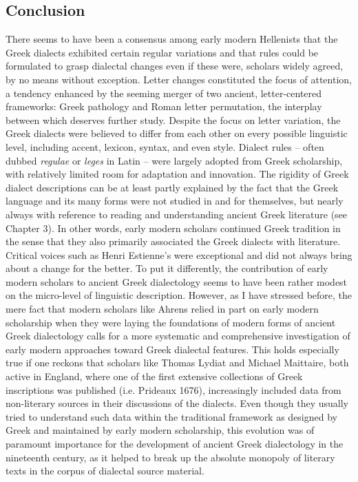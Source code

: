 \subsection{Conclusion}
\hypertarget{Toc19704848}{}\begin{styleStandard}
There seems to have been a consensus among early modern Hellenists that the Greek dialects exhibited certain regular variations and that rules could be formulated to grasp dialectal changes even if these were, scholars widely agreed, by no means without exception. Letter changes constituted the focus of attention, a tendency enhanced by the seeming merger of two ancient, letter-centered frameworks: Greek pathology and Roman letter permutation, the interplay between which deserves further study. Despite the focus on letter variation, the Greek dialects were believed to differ from each other on every possible linguistic level, including accent, lexicon, syntax, and even style. Dialect rules – often dubbed \textit{regulae} or \textit{leges} in Latin – were largely adopted from Greek scholarship, with relatively limited room for adaptation and innovation. The rigidity of Greek dialect descriptions can be at least partly explained by the fact that the Greek language and its many forms were not studied in and for themselves, but nearly always with reference to reading and understanding ancient Greek literature (see Chapter 3). In other words, early modern scholars continued Greek tradition in the sense that they also primarily associated the Greek dialects with literature. Critical voices such as Henri Estienne’s were exceptional and did not always bring about a change for the better. To put it differently, the contribution of early modern scholars to ancient Greek dialectology seems to have been rather modest on the micro-level of linguistic description. However, as I have stressed before, the mere fact that modern scholars like Ahrens relied in part on early modern scholarship when they were laying the foundations of modern forms of ancient Greek dialectology calls for a more systematic and comprehensive investigation of early modern approaches toward Greek dialectal features. This holds especially true if one reckons that scholars like Thomas Lydiat and Michael Maittaire, both active in England, where one of the first extensive collections of Greek inscriptions was published (i.e. Prideaux 1676), increasingly included data from non-literary sources in their discussions of the dialects. Even though they usually tried to understand such data within the traditional framework as designed by Greek and maintained by early modern scholarship, this evolution was of paramount importance for the development of ancient Greek dialectology in the nineteenth century, as it helped to break up the absolute monopoly of literary texts in the corpus of dialectal source material.
\end{styleStandard}

